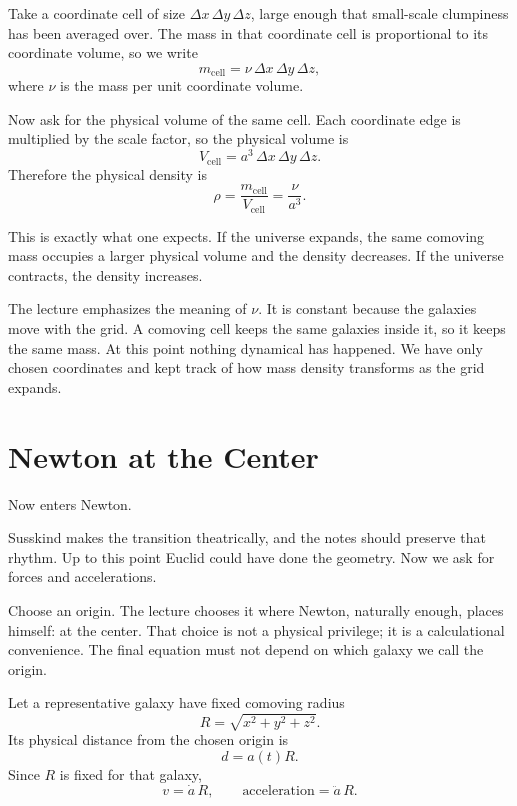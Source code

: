 Take a coordinate cell of size \(\Delta x\,\Delta y\,\Delta z\), large enough that small-scale clumpiness has been averaged over. The mass in that coordinate cell is proportional to its coordinate volume, so we write
\begin{equation}
m_{\text{cell}}=\nu\,\Delta x\,\Delta y\,\Delta z,
\end{equation}
where \(\nu\) is the mass per unit coordinate volume.

Now ask for the physical volume of the same cell. Each coordinate edge is multiplied by the scale factor, so the physical volume is
\begin{equation}
V_{\text{cell}}=a^3\,\Delta x\,\Delta y\,\Delta z.
\end{equation}
Therefore the physical density is
\begin{equation}
\rho=\frac{m_{\text{cell}}}{V_{\text{cell}}}=\frac{\nu}{a^3}.
\end{equation}

This is exactly what one expects. If the universe expands, the same comoving mass occupies a larger physical volume and the density decreases. If the universe contracts, the density increases.

The lecture emphasizes the meaning of \(\nu\). It is constant because the galaxies move with the grid. A comoving cell keeps the same galaxies inside it, so it keeps the same mass. At this point nothing dynamical has happened. We have only chosen coordinates and kept track of how mass density transforms as the grid expands.

\section{Newton at the Center}

Now enters Newton.

Susskind makes the transition theatrically, and the notes should preserve that rhythm. Up to this point Euclid could have done the geometry. Now we ask for forces and accelerations.

Choose an origin. The lecture chooses it where Newton, naturally enough, places himself: at the center. That choice is not a physical privilege; it is a calculational convenience. The final equation must not depend on which galaxy we call the origin.

Let a representative galaxy have fixed comoving radius
\begin{equation}
R=\sqrt{x^2+y^2+z^2}.
\end{equation}
Its physical distance from the chosen origin is
\begin{equation}
d=a(t)R.
\end{equation}
Since \(R\) is fixed for that galaxy,
\begin{equation}
v=\dot a\,R,\qquad \text{acceleration}=\ddot a\,R.
\end{equation}


